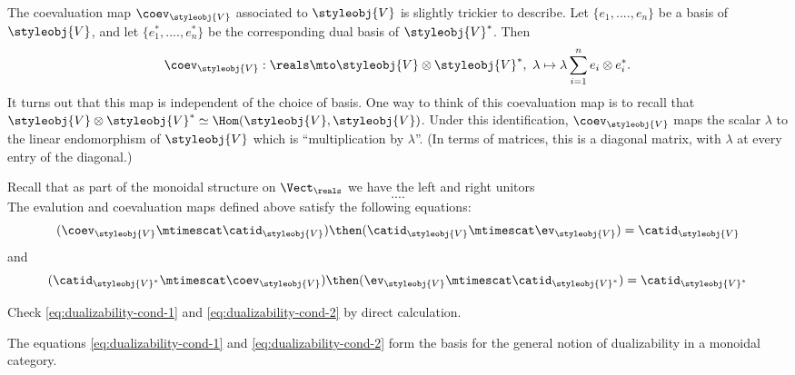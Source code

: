 The coevaluation map $\coev_\styleobj{V} $ associated to $\styleobj{V} $ is slightly trickier to describe. Let $\{e_1, ...., e_n \}$ be a basis of $\styleobj{V}$, and let $\{e_1^*, ...., e_n^* \}$ be the corresponding dual basis of $\styleobj{V}^*$. Then
\begin{equation}\label{eq:coevaluation-vecsp}
\coev_\styleobj{V}  : \reals \mto \styleobj{V}  \otimes \styleobj{V}^*, \ \lambda \mapsto \lambda \sum_{i=1}^n e_i \otimes e_i^*.
\end{equation}
It turns out that this map is independent of the choice of basis. One way to think of this coevaluation map is to recall that $\styleobj{V}  \otimes \styleobj{V}^* \simeq \Hom(\styleobj{V}, \styleobj{V})$. Under this identification, $\coev_\styleobj{V}$ maps the scalar $\lambda$ to the linear endomorphism of $\styleobj{V}$ which is ``multiplication by $\lambda$''. (In terms of matrices, this is a diagonal matrix, with $\lambda$ at every entry of the diagonal.)
 
Recall that as part of the monoidal structure on $\Vect_\reals$ we have the left and right unitors
\begin{equation}
....
\end{equation}
The evalution and coevaluation maps defined above satisfy the following equations:
\begin{equation}\label{eq:dualizability-cond-1}
(\coev_\styleobj{V} \mtimescat \catid_\styleobj{V}) \then (\catid_\styleobj{V} \mtimescat \ev_\styleobj{V}) = \catid_{\styleobj{V}}
\end{equation}
and
\begin{equation}\label{eq:dualizability-cond-2}
 (\catid_{\styleobj{V}^*} \mtimescat \coev_\styleobj{V})  \then (\ev_\styleobj{V} \mtimescat \catid_{\styleobj{V}^*})  = \catid_{\styleobj{V}^*}
\end{equation}

\begin{gradedexercise}
Check \cref{eq:dualizability-cond-1} and \cref{eq:dualizability-cond-2} by direct calculation. 
\end{gradedexercise}

The equations \cref{eq:dualizability-cond-1} and \cref{eq:dualizability-cond-2} form the basis for the general notion of dualizability in a monoidal category. 

